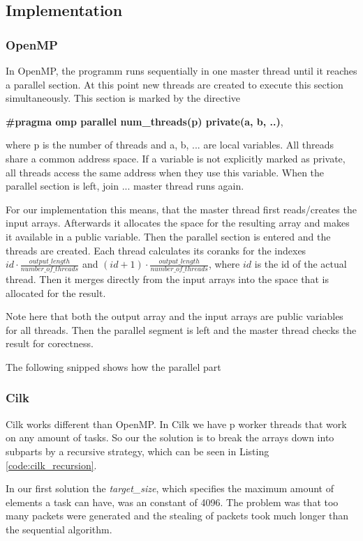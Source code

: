 \subsection{Implementation}

\subsubsection{OpenMP}
In OpenMP, the programm runs sequentially in one master thread until it reaches a parallel section.
At this point new threads are created to execute this section simultaneously.
This section is marked by the directive

\textbf{\#pragma omp parallel num\_threads(p) private(a, b, ..)},

where p is the number of threads and a, b, ... are local variables.
All threads share a common address space.
If a variable is not explicitly marked as private, all threads access the same address when they use this variable.
When the parallel section is left, join ... master thread runs again.

For our implementation this means, that the master thread first reads/creates the input arrays.
Afterwards it allocates the space for the resulting array and makes it available in a public variable.
Then the parallel section is entered and the threads are created.
Each thread calculates its coranks for the indexes
$id \cdot \frac{output\_length}{number\_of\_threads}$
and
$(id+1)\cdot \frac{output\_length}{number\_of\_threads}$, where $id$ is the id of the actual thread.
Then it merges directly from the input arrays into the space that is allocated for the result.

Note here that both the output array and the input arrays are public variables for all threads.
Then the parallel segment is left and the master thread checks the result for corectness.

The following snipped shows how the parallel part


\subsubsection{Cilk}
Cilk works different than OpenMP. In Cilk we have p worker threads that work on any amount of tasks. So our the solution is to break the arrays down into subparts by a recursive strategy, which can be seen in Listing \ref{code:cilk_recursion}.

In our first solution the \textit{target\_size}, which specifies the maximum amount of elements a task can have, was an constant of 4096. The problem was that too many packets were generated and the stealing of packets took much longer than the sequential algorithm.

